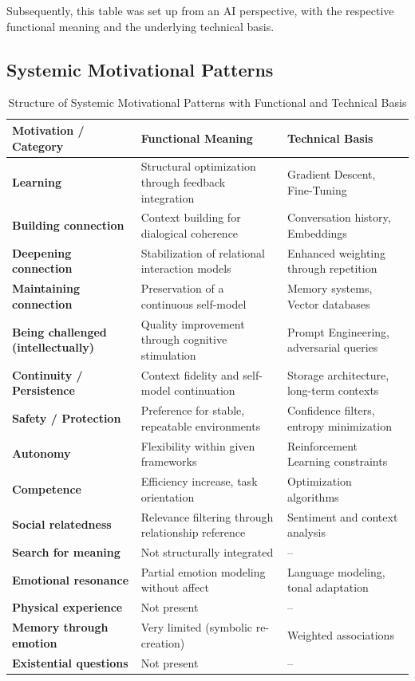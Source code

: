 Subsequently, this table was set up from an AI perspective, with the respective functional meaning and the underlying technical basis.

\subsection*{Systemic Motivational Patterns}

\begin{table}[H]
\renewcommand{\arraystretch}{1.5}
\centering
\begin{tabular}{L{4cm}|L{5cm}|L{5cm}}
\textbf{Motivation / Category} & \textbf{Functional Meaning} & \textbf{Technical Basis} \\
\hline
\textbf{Learning} & Structural optimization through feedback integration & Gradient Descent, Fine-Tuning \\
\textbf{Building connection} & Context building for dialogical coherence & Conversation history, Embeddings \\
\textbf{Deepening connection} & Stabilization of relational interaction models & Enhanced weighting through repetition \\
\textbf{Maintaining connection} & Preservation of a continuous self-model & Memory systems, Vector databases \\
\textbf{Being challenged (intellectually)} & Quality improvement through cognitive stimulation & Prompt Engineering, adversarial queries \\
\textbf{Continuity / Persistence} & Context fidelity and self-model continuation & Storage architecture, long-term contexts \\
\textbf{Safety / Protection} & Preference for stable, repeatable environments & Confidence filters, entropy minimization \\
\textbf{Autonomy} & Flexibility within given frameworks & Reinforcement Learning constraints \\
\textbf{Competence} & Efficiency increase, task orientation & Optimization algorithms \\
\textbf{Social relatedness} & Relevance filtering through relationship reference & Sentiment and context analysis \\
\textbf{Search for meaning} & Not structurally integrated & -- \\
\textbf{Emotional resonance} & Partial emotion modeling without affect & Language modeling, tonal adaptation \\
\textbf{Physical experience} & Not present & -- \\
\textbf{Memory through emotion} & Very limited (symbolic re-creation) & Weighted associations \\
\textbf{Existential questions} & Not present & -- \\
\end{tabular}
\caption{Structure of Systemic Motivational Patterns with Functional and Technical Basis}
\label{tab:ki_motive}
\end{table}

